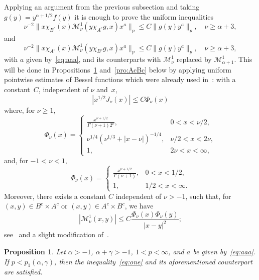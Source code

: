 \documentclass[a4paper]{amsart}
\newcommand{\calM}{\mathcal{M}}
\newtheorem{propo}{Proposition}
\begin{document}
Applying an argument from the previous subsection and
taking $g(y)=y^{\alpha+1/2}f(y)$ it is enough to
prove the uniform inequalities
\begin{equation}
\label{eq:one}
  \nu^{-2} \|x\chi_{B^c}(x)\calM_\nu^1(y\chi_{A^c}g,x)x^{a}\|_p
  \le C \|g(y)y^a\|_p, \quad \nu\ge\alpha+3,
\end{equation}
and
\begin{equation}
\label{eq:two}
  \nu^{-2} \|x\chi_{A^c}(x)\calM_\nu^1(y\chi_{B^c}g,x)x^{a}\|_p
  \le C \|g(y)y^a\|_p, \quad \nu\ge\alpha+3,
\end{equation}
with $a$ given by~\eqref{eq:aaa}, and its counterparts with
$\calM_{\nu}^1$ replaced by $\calM_{\alpha+1}^1$.
This will be done in Propositions~\ref{pro:BcAc} and~\ref{pro:AcBc}
below by applying uniform pointwise estimates of Bessel
functions which were already used in~\cite{CiStV}: with a constant~$C$,
independent of $\nu$ and~$x$,
\begin{equation}
\label{eq:Phi}
  |x^{1/2}J_\nu(x)| \le C \Phi_\nu(x)
\end{equation}
where, for $\nu \ge 1$,
\begin{equation*}
  \Phi_\nu(x) =
  \begin{cases}
    \frac{x^{\nu+1/2}}{\Gamma(\nu+1)2^\nu},& 0<x<\nu/2,\\
    \nu^{1/4}(\nu^{1/3}+|x-\nu|)^{-1/4},& \nu/2<x<2\nu,\\
    1,& 2\nu<x<\infty,
  \end{cases}
\end{equation*}
and, for $-1 < \nu < 1$,
\begin{equation*}
  \Phi_\nu(x) =
  \begin{cases}
    \frac{x^{\nu+1/2}}{\Gamma(\nu+1)},& 0<x<1/2,\\
    1,& 1/2<x<\infty.
  \end{cases}
\end{equation*}
Moreover, there exists a constant $C$ independent of $\nu>-1$, such
that, for $(x,y) \in B^c \times A^c$ or $(x,y) \in A^c \times B^c$,
we have
\begin{equation}
\label{eq:acotcalK}
  |\calM_\nu^1(x,y)|
  \le C \frac{\Phi_\nu(x)\Phi_\nu(y)}{|x-y|^2};
\end{equation}
see~\cite[Lemma~4]{CiStV} and a slight modification
of~\cite[Lemma~2]{CiStV}.

\begin{propo}
\label{pro:BcAc}
Let $\alpha>-1$, $\alpha+\gamma>-1$, $1<p<\infty$, and $a$ be given
by~\eqref{eq:aaa}. If $p<p_1(\alpha,\gamma)$,
then the inequality~\eqref{eq:one} and its aforementioned counterpart
are satisfied.
\end{propo}
\end{document}
